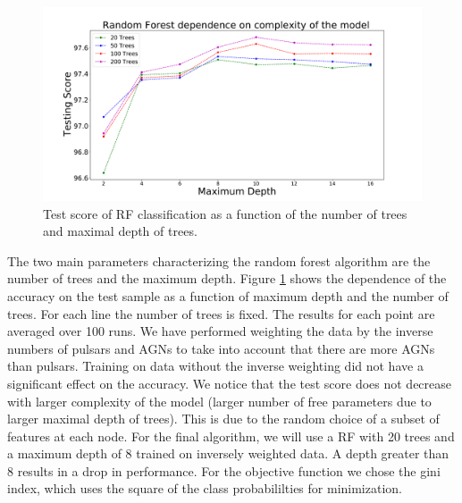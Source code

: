 \begin{figure}[h]
\includegraphics[width=\twopicsp\textwidth]{plots/assocvstrees}
\caption{
Test score of RF classification as a function of the number of trees and maximal depth of trees.
}
\label{fig:RF_complexity}
\end{figure}

The two main parameters characterizing the random forest algorithm are the number of trees and the maximum depth. 
Figure \ref{fig:RF_complexity} shows the dependence of the accuracy on the test sample as a function of maximum depth and the number of trees. For each line the number of trees is fixed.
The results for each point are averaged over 100 runs.
We have performed weighting the data by the inverse numbers of pulsars and AGNs to take into account that there are more AGNs than pulsars. Training on data without the inverse weighting did not have a significant effect on the accuracy.
We notice that the test score does not decrease with larger complexity of the model 
(larger number of free parameters due to larger maximal depth of trees).
This is due to the random choice of a subset of features at each node.
For the final algorithm, we will use a RF with 20 trees and a maximum depth of 8 trained on inversely weighted data. A depth greater than 8 results in a drop in performance. For the objective function we chose the gini index, which uses the square of the class probabililties for minimization.\\

